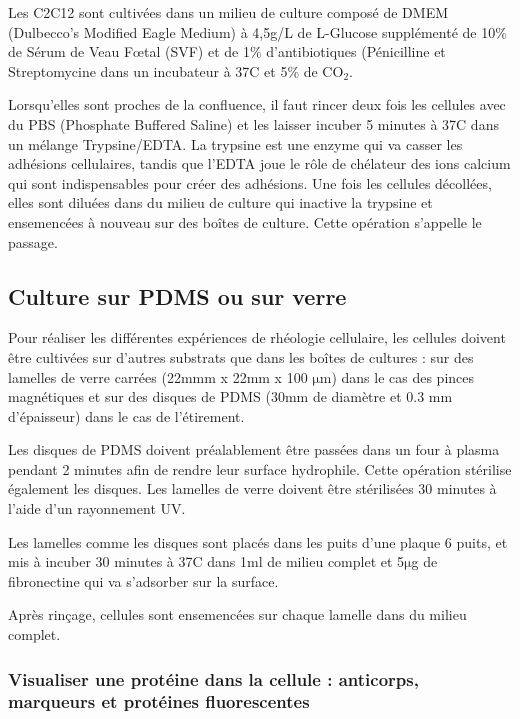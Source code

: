 \documentclass{report}
\newcommand{\micro}{$\mathrm{\mu}$}
\begin{document}
	Les C2C12 sont cultivées dans un milieu de culture composé de DMEM (Dulbecco's Modified Eagle Medium) à 4,5g/L de L-Glucose supplémenté de 10\% de Sérum de Veau F\oe tal (SVF) et de 1\% d'antibiotiques (Pénicilline et Streptomycine dans un incubateur à 37\degres   C et 5\% de CO$_2$. 
	
	
	Lorsqu'elles sont proches de la confluence, il faut rincer deux fois les cellules avec du PBS (Phosphate Buffered Saline) et les laisser incuber 5 minutes à 37\degres   C dans un mélange Trypsine/EDTA. La trypsine est une enzyme qui va casser les adhésions cellulaires, tandis que l'EDTA joue le rôle de chélateur des ions calcium qui sont indispensables pour créer des adhésions. Une fois les cellules décollées, elles sont diluées dans du milieu de culture qui inactive la trypsine et ensemencées à nouveau sur des boîtes de culture. Cette opération s'appelle le passage. 
	 
	\subsection{Culture sur PDMS ou sur verre  \label{Coating}}

	Pour réaliser les différentes expériences de rhéologie cellulaire, les cellules doivent être cultivées sur d'autres substrats que dans les boîtes de cultures : sur des lamelles de verre carrées (22mmm x 22mm x 100 \micro m) dans le cas des pinces magnétiques et sur des disques de PDMS (30mm de diamètre et 0.3 mm d'épaisseur) dans le cas de l'étirement. 
	
	Les disques de PDMS doivent préalablement être passées dans un four à plasma pendant 2 minutes afin de rendre leur surface hydrophile. Cette opération stérilise également les disques. Les lamelles de verre doivent être stérilisées 30 minutes à l'aide d'un rayonnement UV. 
	
	Les lamelles comme les disques sont placés dans les puits d'une plaque 6 puits, et mis à incuber 30 minutes à 37\degres   C dans 1ml de milieu complet et 5\micro g de fibronectine qui va s'adsorber sur la surface. 
	
	Après rinçage,  cellules sont ensemencées sur chaque lamelle dans du milieu complet. 
	
	\subsubsection{Visualiser une protéine dans la cellule : anticorps, marqueurs et protéines fluorescentes}
	
\end{document}
